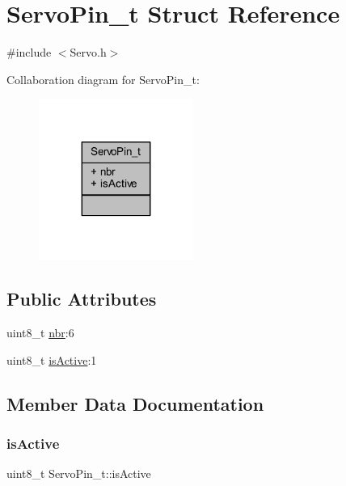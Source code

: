 \hypertarget{struct_servo_pin__t}{}\section{Servo\+Pin\+\_\+t Struct Reference}
\label{struct_servo_pin__t}


{\ttfamily \#include $<$Servo.\+h$>$}



Collaboration diagram for Servo\+Pin\+\_\+t\+:
\nopagebreak
\begin{figure}[H]
\begin{center}
\leavevmode
\includegraphics[width=143pt]{d4/dbf/struct_servo_pin__t__coll__graph}
\end{center}
\end{figure}
\subsection*{Public Attributes}
\begin{DoxyCompactItemize}
\item 
uint8\+\_\+t \hyperlink{struct_servo_pin__t_ad2ff0e34820e04a276e38d359021b03c}{nbr}\+:6
\item 
uint8\+\_\+t \hyperlink{struct_servo_pin__t_aaf3c1889bb99bc6f936a3cfb6eba532a}{is\+Active}\+:1
\end{DoxyCompactItemize}


\subsection{Member Data Documentation}
\mbox{\label{struct_servo_pin__t_aaf3c1889bb99bc6f936a3cfb6eba532a}} 
\subsubsection{\texorpdfstring{is\+Active}{isActive}}
{\footnotesize\ttfamily uint8\+\_\+t Servo\+Pin\+\_\+t\+::is\+Active}

